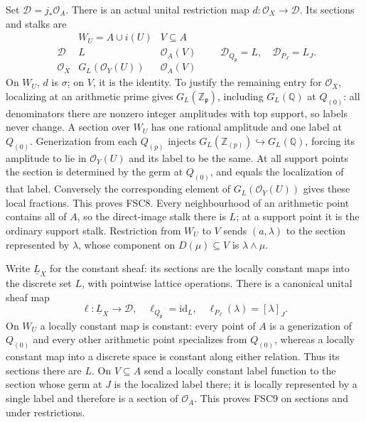 \documentclass[11pt,a4paper]{article}
\theoremstyle{definition}\newtheorem{definition}[theorem]{Definition}
\begin{document}
Set $\mathcal D=j_*\mathcal O_A$. There is an actual unital restriction
map $d:\mathcal O_X\to\mathcal D$. Its sections and stalks are
\begin{equation}\tag{FSC8}
 \begin{array}{c|cc}
 &W_U=A\cup i(U)&V\subseteq A\\ \hline
 \mathcal D&L&\mathcal O_A(V)\\
 \mathcal O_X&G_L(\mathcal O_Y(U))&\mathcal O_A(V)
 \end{array}
 \qquad
 \mathcal D_{Q_{\mathfrak p}}=L,\quad\mathcal D_{P_J}=L_J.
\end{equation}
On $W_U$, $d$ is $\sigma$; on $V$, it is the identity.
To justify the remaining entry for $\mathcal O_X$, localizing at an
arithmetic prime gives $G_L(\mathbb Z_{\mathfrak p})$, including
$G_L(\mathbb Q)$ at $Q_{(0)}$: all denominators there are nonzero
integer amplitudes with top support, so labels never change. A section
over $W_U$ has one rational amplitude and one label at $Q_{(0)}$.
Generization from each $Q_{(p)}$ injects
$G_L(\mathbb Z_{(p)})\hookrightarrow G_L(\mathbb Q)$, forcing its
amplitude to lie in $\mathcal O_Y(U)$ and its label to be the same.
At all support points the section is determined by the germ at
$Q_{(0)}$, and equals the localization of that label. Conversely the
corresponding element of $G_L(\mathcal O_Y(U))$ gives these local
fractions. This proves FSC8. Every neighbourhood of an arithmetic
point contains all of $A$, so the direct-image stalk there is $L$;
at a support point it is the ordinary support stalk. Restriction
from $W_U$ to $V$ sends $(a,\lambda)$ to the section represented by
$\lambda$, whose component on $D(\mu)\subseteq V$ is
$\lambda\wedge\mu$.

Write $\underline L_X$ for the constant sheaf: its sections are the
locally constant maps into the discrete set $L$, with pointwise lattice
operations. There is a canonical unital sheaf map
\begin{equation}\tag{FSC9}
 \ell:\underline L_X\longrightarrow\mathcal D,
 \quad \ell_{Q_{\mathfrak p}}=\mathrm{id}_L,
 \quad \ell_{P_J}(\lambda)=[\lambda]_J.
\end{equation}
On $W_U$ a locally constant map is constant: every point of $A$ is a
generization of $Q_{(0)}$ and every other arithmetic point specializes
from $Q_{(0)}$, whereas a locally constant map into a discrete space
is constant along either relation. Thus its sections there are $L$.
On $V\subseteq A$ send a locally constant label function to the
section whose germ at $J$ is the localized label there; it is locally
represented by a single label and therefore is a section of $\mathcal
O_A$. This proves FSC9 on sections and under restrictions.
\end{document}
